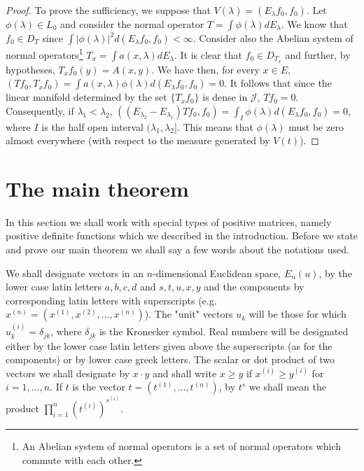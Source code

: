 \documentclass{article}
\begin{document}
\begin{proof}
To prove the sufficiency, we suppose that $V(\lambda) = (E_\lambda f_0, f_0)$. Let $\phi(\lambda) \in L_0$ and consider the normal operator $T = \int \phi(\lambda) dE_\lambda$. We know that $f_0 \in D_T$ since $\int |\phi(\lambda)|^2 d(E_\lambda f_0, f_0) < \infty$. Consider also the Abelian system of normal operators\footnote{An Abelian system of normal operators is a set of normal operators which commute with each other.} $T_x = \int a(x, \lambda) dE_\lambda$. It is clear that $f_0 \in D_{T_x}$ and further, by hypotheses, $T_x f_0(y) = A(x, y)$. We have then, for every $x \in E$, $(Tf_0, T_x f_0) = \int a(x, \lambda) \phi(\lambda) d(E_\lambda f_0, f_0) = 0$. It follows that since the linear manifold determined by the set $\{T_x f_0\}$ is dense in $\mathcal{J}$, $Tf_0 = 0$. Consequently, if $\lambda_1 < \lambda_2$, $((E_{\lambda_2} - E_{\lambda_1})Tf_0, f_0) = \int_I \phi(\lambda) d(E_\lambda f_0, f_0) = 0$, where $I$ is the half open interval $(\lambda_1, \lambda_2]$. This means that $\phi(\lambda)$ must be zero almost everywhere (with respect to the measure generated by $V(t)$).
\end{proof}

\section{The main theorem}
\label{sec:main-theorem}

In this section we shall work with special types of positive matrices, namely positive definite functions which we described in the introduction. Before we state and prove our main theorem we shall say a few words about the notations used.

We shall designate vectors in an $n$-dimensional Euclidean space, $E_n(u)$, by the lower case latin letters $a, b, c, d$ and $s, t, u, x, y$ and the components by corresponding latin letters with superscripts (e.g. $x^{(n)} = (x^{(1)}, x^{(2)}, \ldots, x^{(n)})$). The "unit" vectors $u_k$ will be those for which $u_k^{(i)} = \delta_{jk}$, where $\delta_{jk}$ is the Kronecker symbol. Real numbers will be designated either by the lower case latin letters given above the superscripts (as for the components) or by lower case greek letters. The scalar or dot product of two vectors we shall designate by $x \cdot y$ and shall write $x \geq y$ if $x^{(i)} \geq y^{(i)}$ for $i = 1, \ldots, n$. If $t$ is the vector $t = (t^{(1)}, \ldots, t^{(n)})$, by $t^s$ we shall mean the product $\prod_{i=1}^n (t^{(i)})^{s^{(i)}}$.
\end{document}
